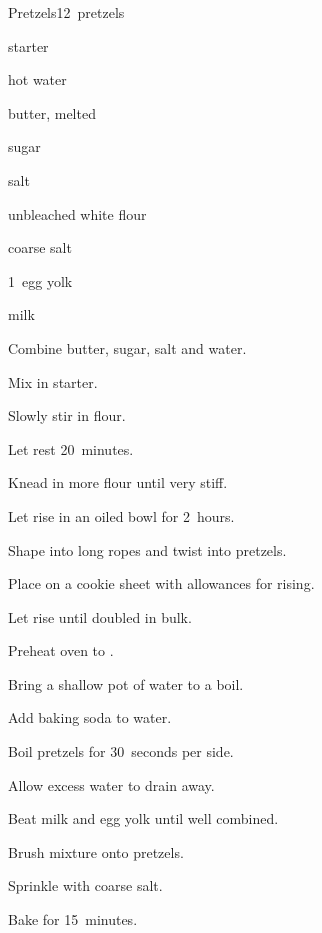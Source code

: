 \begin{recipe}{Pretzels}{}{12~pretzels}

\begin{ingredients}
\item {} starter
\item \C{\half} hot water
\item {} butter, melted
\item \Tp{1\half} sugar
\item {} salt
\item {} unbleached white flour
\item coarse salt
\item 1~egg yolk
\item {} milk
\end{ingredients}

\begin{directions}
\item Combine butter, sugar, salt and water.
\item Mix in starter.
\item Slowly stir in flour.
\item Let rest 20~minutes.
\item Knead in more flour until very stiff.
\item Let rise in an oiled bowl for 2~hours.
\item Shape into long ropes and twist into pretzels.
\item Place on a cookie sheet with allowances for rising.
\item Let rise until doubled in bulk.
\item Preheat oven to .
\item Bring a shallow pot of water to a boil.
\item Add baking soda to water.
\item Boil pretzels for 30~seconds per side.
\item Allow excess water to drain away.
\item Beat milk and egg yolk until well combined.
\item Brush mixture onto pretzels.
\item Sprinkle with coarse salt.
\item Bake for 15~minutes.
\end{directions}
\end{recipe}
